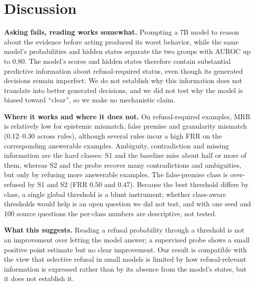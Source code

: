 \documentclass[conference]{IEEEtran}
\begin{document}
\section{Discussion}
\textbf{Asking fails, reading works somewhat.} Prompting a 7B model to reason about the evidence before acting produced its worst behavior, while the same model's probabilities and hidden states separate the two groups with AUROC up to 0.80. The model's scores and hidden states therefore contain substantial predictive information about refusal-required status, even though its generated decisions remain imperfect. We do not establish why this information does not translate into better generated decisions, and we did not test why the model is biased toward ``clear'', so we make no mechanistic claim.

\textbf{Where it works and where it does not.} On refusal-required examples, MRR is relatively low for epistemic mismatch, false premise and granularity mismatch (0.12--0.30 across rules), although several rules incur a high FRR on the corresponding answerable examples. Ambiguity, contradiction and missing information are the hard classes: S1 and the baseline miss about half or more of them, whereas S2 and the probe recover many contradictions and ambiguities, but only by refusing more answerable examples. The false-premise class is over-refused by S1 and S2 (FRR 0.50 and 0.47). Because the best threshold differs by class, a single global threshold is a blunt instrument; whether class-aware thresholds would help is an open question we did not test, and with one seed and 100 source questions the per-class numbers are descriptive, not tested.

\textbf{What this suggests.} Reading a refusal probability through a threshold is not an improvement over letting the model answer; a supervised probe shows a small positive point estimate but no clear improvement. Our result is compatible with the view that selective refusal in small models is limited by how refusal-relevant information is expressed rather than by its absence from the model's states, but it does not establish it.
\end{document}
